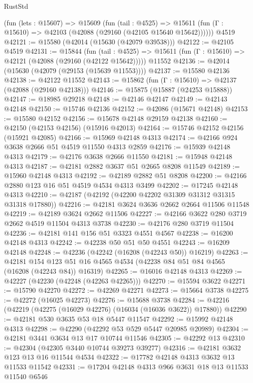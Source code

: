 \begin{lexlean}{RustStd}
\begin{coremodule}
    (fun (lets : @15607) =>
    @15609
      (fun (tail : @4525) =>
      @15611 (fun (Γ : @15610) => @42103 (@42088 (@29160 (@42105 @15640 @15642))))))
    @4519
@42121 := @15580 (@42014 (@15630 (@42079 @39538)))
@42122 := @42105 @4519
@42131 := @15844
    (fun (tail : @4525) => @15611 (fun (Γ : @15610) => @42121 (@42088 (@29160 (@42122 @15642)))))
    @11552
@42136 := @42014 (@15630 (@42079 (@29153 (@15639 @11553))))
@42137 := @15580 @42136
@42138 := @42122 @11552
@42143 := @15862 (fun (Γ : @15610) => @42137 (@42088 (@29160 @42138)))
@42146 := @15875 (@15887 (@24253 @15888))
@42147 := @18985 @29218
@42148 := @42146 @42147
@42149 := @42143 @42148
@42150 := @15746 @42136
@42152 := @42086 (@15671 @42148)
@42153 := @15580 @42152
@42156 := @15678 @42148 @29159 @42138
@42160 := @42150 (@42153 @42156) (@15916 @42013)
@42164 := @15746 @42152 @42156 (@15921 @42085)
@42166 := @15969 @42148 @4313
@42174 := @42166 @924 @3638 @2666 @51 @4519 @11550 @4313 @2859
@42176 := @15939 @42148 @4313
@42179 := @42176 @3638 @2666 @11550
@42181 := @15948 @42148 @4313
@42187 := @42181 @2882 @3637 @51 @2665 @8208 @11549
@42189 := @15960 @42148 @4313
@42192 := @42189 @2882 @51 @8208
@42200 := @42166 @2880 @123 @16 @51 @4519 @4534 @4313 @3499
@42202 := @17245 @42148 @4313
@42210 := @42187 (@42192 (@42200 @42202 @31309 @31312 @31315 @31318 @17880))
@42216 := @42181 @3624 @3636 @2662 @2664 @11506 @11548
@42219 := @42189 @3624 @2662 @11506
@42227 := @42166 @3622 @280 @3719 @2662 @4519 @11504 @4313 @3738
@42230 := @42176 @280 @3719 @11504
@42236 := @42181 @141 @156 @51 @3323 @4551 @4567
@42238 := @16200 @42148 @4313
@42242 := @42238 @50 @51 @50 @4551
@42243 := @16209 @42148
@42248 := @42236 (@42242 (@16208 (@42243 @50)) @16219)
@42263 := @42181
    @154
    @123
    @51
    @16
    @4565
    @4534
    (@42238 @84 @51 @84 @4565 (@16208 (@42243 @84)) @16319)
@42265 := @16016 @42148 @4313
@42269 := @42227 (@42230 (@42248 (@42263 @42265)))
@42270 := @15594 @3622
@42271 := @15790 @42270
@42272 := @42269 @42271
@42273 := @15664 @3738
@42275 := @42272 (@16025 @42273)
@42276 := @15688 @3738
@42284 := @42216 (@42219 (@42275 (@16029 @42276) (@16034 (@16036 @3622)) @17880))
@42290 := @42181 @530 @3635 @53 @18 @5447 @11547
@42292 := @15992 @42148 @4313
@42298 := @42290 (@42292 @53 @529 @5447 @20985 @20989)
@42304 := @42181 @3441 @3634 @13 @17 @10744 @11546
@42305 := @42292 @13
@42310 := @42304 (@42305 @3440 @10744 @39273 @39277)
@42316 := @42181 @3632 @123 @13 @16 @11544 @4534
@42322 := @17782 @42148 @4313 @3632 @13 @11533 @11542
@42331 := @17204 @42148 @4313 @966 @3631 @18 @13 @11533 @11540 @6546

\end{coremodule}
\end{lexlean}
